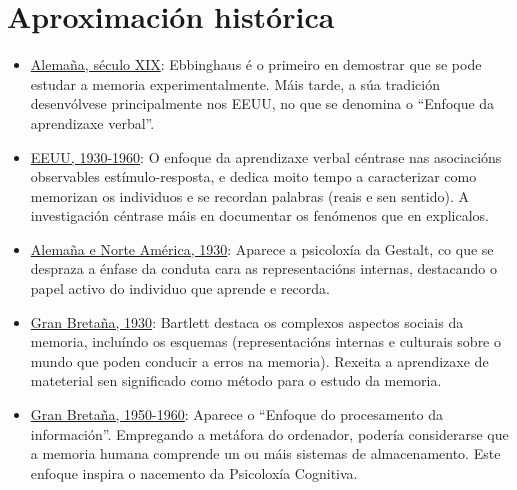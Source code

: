 \documentclass[a4paper,11pt]{article}
\begin{document}
\section{Aproximación histórica}
\begin{itemize}
	\item \underline{Alemaña, século XIX}: Ebbinghaus é o primeiro en demostrar que se pode estudar a 	memoria experimentalmente. Máis tarde, a súa tradición desenvólvese principalmente nos EEUU, no 		que se denomina o ``Enfoque da aprendizaxe verbal''.
	\item \underline{EEUU, 1930-1960}: O enfoque da aprendizaxe verbal céntrase nas asociacións 			observables estímulo-resposta, e dedica moito tempo a caracterizar como memorizan os individuos e 	se recordan palabras (reais e sen sentido). A investigación céntrase máis en documentar os 				fenómenos que en explicalos.
	\item \underline{Alemaña e Norte América, 1930}: Aparece a psicoloxía da Gestalt, co que se 			despraza a énfase da conduta cara 	as representacións internas, destacando o papel activo do 			individuo que aprende e recorda.
	\item \underline{Gran Bretaña, 1930}: Bartlett destaca os complexos aspectos sociais da memoria, 		incluíndo os esquemas (representacións internas e culturais sobre o mundo que poden conducir a 			erros na memoria). Rexeita a aprendizaxe de mateterial sen significado como método para o estudo 		da memoria.
	\item \underline{Gran Bretaña, 1950-1960}: Aparece o ``Enfoque do procesamento da información''. 		Empregando a metáfora do ordenador, podería considerarse que a memoria humana comprende un ou 			máis sistemas de almacenamento. Este enfoque inspira o nacemento da Psicoloxía Cognitiva.
\end{itemize}
\end{document}

